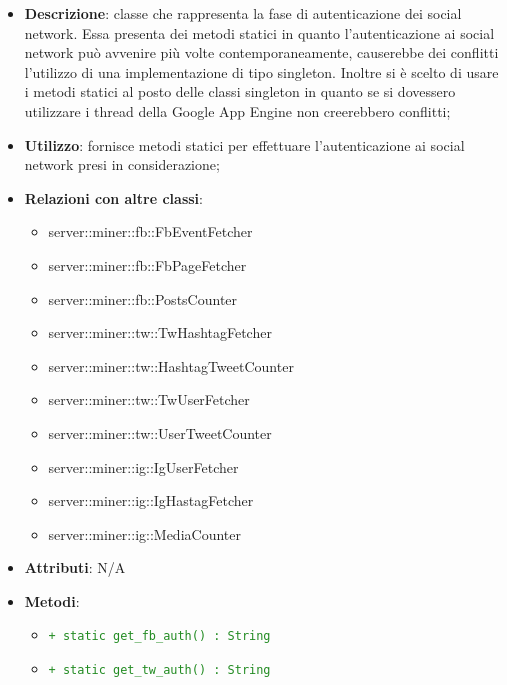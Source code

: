 				\begin{itemize}
				\item \textbf{Descrizione}: classe che rappresenta la fase di autenticazione dei social network. Essa presenta dei metodi statici in quanto l'autenticazione ai social network può avvenire più volte contemporaneamente, causerebbe dei conflitti l'utilizzo di una implementazione di tipo singleton. Inoltre si è scelto di usare i metodi statici al posto delle classi singleton in quanto se si dovessero utilizzare i thread della Google App Engine non creerebbero conflitti;
				\item \textbf{Utilizzo}: fornisce metodi statici per effettuare l'autenticazione ai social network presi in considerazione;
				\item \textbf{Relazioni con altre classi}:
					\begin{itemize}
						\item server::miner::fb::FbEventFetcher
						\item server::miner::fb::FbPageFetcher
						\item server::miner::fb::PostsCounter
						\item server::miner::tw::TwHashtagFetcher
						\item server::miner::tw::HashtagTweetCounter
						\item server::miner::tw::TwUserFetcher
						\item server::miner::tw::UserTweetCounter
						\item server::miner::ig::IgUserFetcher
						\item server::miner::ig::IgHastagFetcher
						\item server::miner::ig::MediaCounter
					\end{itemize}
				\item \textbf{Attributi}: N/A
				\item \textbf{Metodi}:
					\begin{itemize}
						\item \textcolor{forestgreen}{\texttt{+ static get\_fb\_auth() : String}}
						\item \textcolor{forestgreen}{\texttt{+ static get\_tw\_auth() : String}}

\end{itemize}
\end{itemize}
